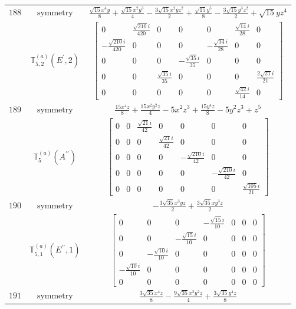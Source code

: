 \documentclass[fleqn,8pt,landscape]{jsarticle}
\begin{document}
\begin{longtable}{ccc}
$ 188 $ & $ \text{symmetry} $ & $ \frac{\sqrt{15} x^{4} y}{8} + \frac{\sqrt{15} x^{2} y^{3}}{4} - \frac{3 \sqrt{15} x^{2} y z^{2}}{2} + \frac{\sqrt{15} y^{5}}{8} - \frac{3 \sqrt{15} y^{3} z^{2}}{2} + \sqrt{15} y z^{4} $ \\
$  $ & $ \mathbb{T}_{5,2}^{(a)}(E^{\prime},2) $ & $ \begin{bmatrix} 0 & \frac{\sqrt{210} i}{420} & 0 & 0 & 0 & \frac{\sqrt{14} i}{28} & 0 \\ - \frac{\sqrt{210} i}{420} & 0 & 0 & 0 & - \frac{\sqrt{14} i}{28} & 0 & 0 \\ 0 & 0 & 0 & - \frac{\sqrt{35} i}{35} & 0 & 0 & 0 \\ 0 & 0 & \frac{\sqrt{35} i}{35} & 0 & 0 & 0 & \frac{2 \sqrt{21} i}{21} \\ 0 & 0 & 0 & 0 & 0 & \frac{\sqrt{42} i}{14} & 0 \end{bmatrix} $ \\ \hline
$ 189 $ & $ \text{symmetry} $ & $ \frac{15 x^{4} z}{8} + \frac{15 x^{2} y^{2} z}{4} - 5 x^{2} z^{3} + \frac{15 y^{4} z}{8} - 5 y^{2} z^{3} + z^{5} $ \\
$  $ & $ \mathbb{T}_{5}^{(a)}(A^{\prime\prime}) $ & $ \begin{bmatrix} 0 & 0 & \frac{\sqrt{21} i}{42} & 0 & 0 & 0 & 0 \\ 0 & 0 & 0 & \frac{\sqrt{21} i}{42} & 0 & 0 & 0 \\ 0 & 0 & 0 & 0 & - \frac{\sqrt{210} i}{42} & 0 & 0 \\ 0 & 0 & 0 & 0 & 0 & - \frac{\sqrt{210} i}{42} & 0 \\ 0 & 0 & 0 & 0 & 0 & 0 & \frac{\sqrt{105} i}{21} \end{bmatrix} $ \\ \hline
$ 190 $ & $ \text{symmetry} $ & $ - \frac{3 \sqrt{35} x^{3} y z}{2} + \frac{3 \sqrt{35} x y^{3} z}{2} $ \\
$  $ & $ \mathbb{T}_{5,1}^{(a)}(E^{\prime\prime},1) $ & $ \begin{bmatrix} 0 & 0 & 0 & - \frac{\sqrt{15} i}{10} & 0 & 0 & 0 \\ 0 & 0 & - \frac{\sqrt{15} i}{10} & 0 & 0 & 0 & 0 \\ 0 & - \frac{\sqrt{10} i}{10} & 0 & 0 & 0 & 0 & 0 \\ - \frac{\sqrt{10} i}{10} & 0 & 0 & 0 & 0 & 0 & 0 \\ 0 & 0 & 0 & 0 & 0 & 0 & 0 \end{bmatrix} $ \\ \hline
$ 191 $ & $ \text{symmetry} $ & $ \frac{3 \sqrt{35} x^{4} z}{8} - \frac{9 \sqrt{35} x^{2} y^{2} z}{4} + \frac{3 \sqrt{35} y^{4} z}{8} $ \\

\end{longtable}
\end{document}
